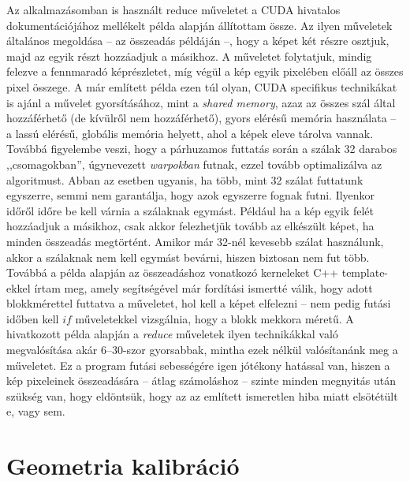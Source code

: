 \documentclass[a4paper,12pt]{article}
\begin{document}
Az alkalmazásomban is használt reduce műveletet  a CUDA hivatalos dokumentációjához mellékelt példa \cite{reduce} alapján állítottam össze. Az ilyen műveletek általános megoldása -- az összeadás példáján --, hogy a képet két részre osztjuk, majd az egyik részt hozzáadjuk a másikhoz. A műveletet folytatjuk, mindig felezve a fennmaradó képrészletet, míg végül a kép egyik pixelében előáll az összes pixel összege. A már említett példa ezen túl olyan, CUDA specifikus technikákat is ajánl a művelet gyorsításához, mint a \emph{shared memory}, azaz az összes szál által hozzáférhető (de kívülről nem hozzáférhető), gyors elérésű memória használata -- a lassú elérésű, globális memória helyett, ahol a képek eleve tárolva vannak. Továbbá figyelembe veszi, hogy a párhuzamos futtatás során a szálak 32 darabos ,,csomagokban'',  úgynevezett \emph{warpokban} futnak, ezzel tovább optimalizálva az algoritmust. Abban az esetben ugyanis, ha több, mint 32 szálat futtatunk egyszerre, semmi nem garantálja, hogy azok egyszerre fognak futni. Ilyenkor időről időre be kell várnia a szálaknak egymást. Például ha a kép egyik felét hozzáadjuk a másikhoz, csak akkor felezhetjük tovább az elkészült képet, ha minden összeadás megtörtént. Amikor már 32-nél kevesebb szálat használunk, akkor a szálaknak nem kell egymást bevárni, hiszen biztosan nem fut több. Továbbá a példa alapján az összeadáshoz vonatkozó kerneleket C++ template-ekkel írtam meg, amely segítségével már fordítási ismertté válik, hogy adott blokkmérettel futtatva a műveletet, hol kell a képet elfelezni -- nem pedig futási időben kell $if$ műveletekkel vizsgálnia, hogy a blokk mekkora méretű. A hivatkozott példa alapján a \emph{reduce} műveletek ilyen technikákkal való megvalósítása akár $6$--$30$-szor gyorsabbak, mintha ezek nélkül valósítanánk meg a műveletet. Ez a program futási sebességére igen jótékony hatással van, hiszen a kép pixeleinek összeadására -- átlag számoláshoz -- szinte minden megnyitás után szükség van, hogy eldöntsük, hogy az az említett ismeretlen hiba miatt elsötétült e, vagy sem. 




\section{Geometria kalibráció}
\label{sec:geomkalib}
\end{document}
